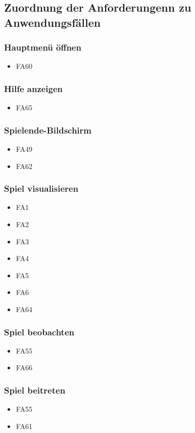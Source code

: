\subsection{Zuordnung der Anforderungenn zu Anwendungsfällen}
\subsubsection{Hauptmenü öffnen}
\begin{itemize} 
	\item FA60
\end{itemize}
\subsubsection{Hilfe anzeigen}
\begin{itemize} 
	\item FA65
\end{itemize}
\subsubsection{Spielende-Bildschirm}
\begin{itemize} 
	\item FA49
	\item FA62
\end{itemize}
\subsubsection{Spiel visualisieren}
\begin{itemize} 
	\item FA1
	\item FA2 
	\item FA3 
	\item FA4 
	\item FA5 
	\item FA6 
	\item FA64 
\end{itemize}
\subsubsection{Spiel beobachten}
\begin{itemize} 
	\item FA55
	\item FA66 
\end{itemize}
\subsubsection{Spiel beitreten}
\begin{itemize} 
	\item FA55
	\item FA61 
\end{itemize}
